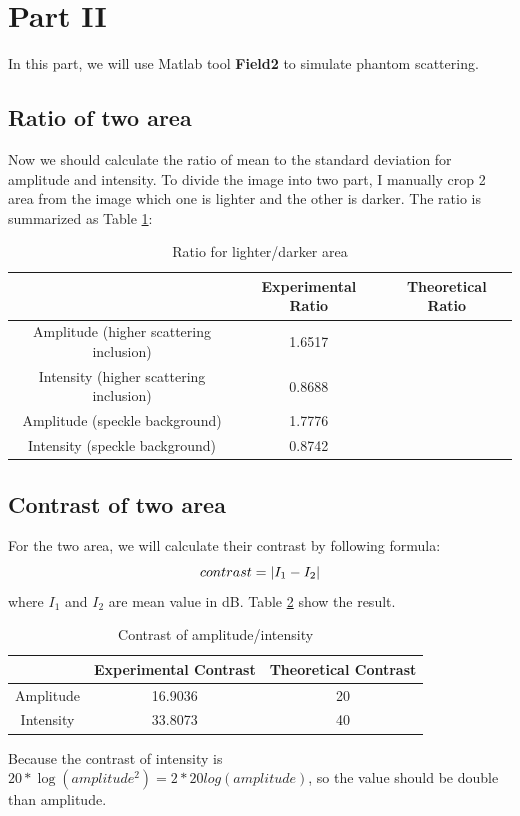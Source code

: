 \documentclass{article}
\DeclarePairedDelimiter\abs{\lvert}{\rvert}%
\begin{document}
\section{Part \RN{2}}
In this part, we will use Matlab tool \textbf{Field2} to simulate phantom scattering.

\subsection{Ratio of two area}
Now we should calculate the ratio of mean to the standard deviation for amplitude and intensity. To divide the image into
two part, I manually crop 2 area from the image which one is lighter and the other is darker. The ratio is summarized as Table \ref{tab:ratio}:

\begin{table}[H]
  \centering
    \begin{tabular}{|c|c|c|}
    \hline
          & Experimental Ratio & Theoretical Ratio \bigstrut\\
    \hline
    Amplitude (higher scattering inclusion) &   1.6517    &  \bigstrut\\
    \hline
    Intensity (higher scattering inclusion) &   0.8688    &  \bigstrut\\
    \hline
    Amplitude (speckle background) &   1.7776    &  \bigstrut\\
    \hline
    Intensity (speckle background) &   0.8742    &  \bigstrut\\
    \hline
    \end{tabular}%
  \caption{Ratio for lighter/darker area}
  \label{tab:ratio}%
\end{table}%

\subsection{Contrast of two area}
For the two area, we will calculate their contrast by following formula:
$$
	contrast = \abs{I_1 - I_2}
$$
where $I_1$ and $I_2$ are mean value in dB. Table \ref{tab:contrast} show the result.
\begin{table}[H]
  \centering
  
    \begin{tabular}{|c|c|c|}
    \hline
          & Experimental Contrast & Theoretical Contrast \bigstrut\\
    \hline
    Amplitude & 16.9036 & 20 \bigstrut\\
    \hline
    Intensity & 33.8073 & 40 \bigstrut\\
    \hline
    \end{tabular}%
    \caption{Contrast of amplitude/intensity}
  \label{tab:contrast}%
\end{table}%
Because the contrast of intensity is $20 * \log(amplitude^2) = 2 * 20 log(amplitude)$, so the value should be double than amplitude.
\end{document}

